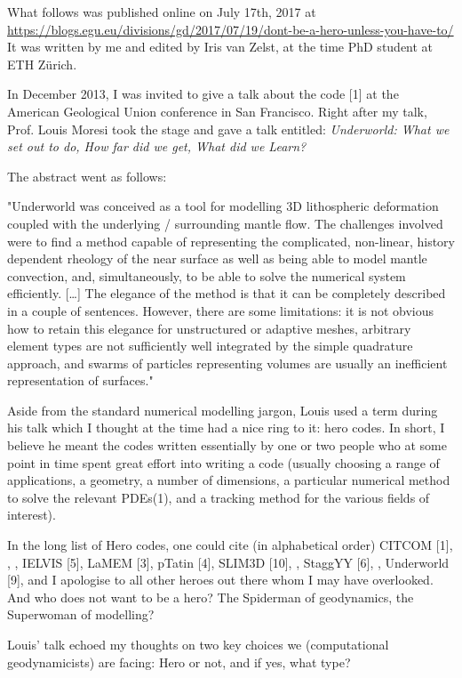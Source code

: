 What follows was published online on July 17th, 2017 at 
\url{https://blogs.egu.eu/divisions/gd/2017/07/19/dont-be-a-hero-unless-you-have-to/}
It was written by me and edited by Iris van Zelst, at the time PhD student at ETH Z\"urich.

\vspace{3mm}

In December 2013, I was invited to give a talk about the \aspect{} code [1] 
at the American Geological Union conference in San Francisco. Right 
after my talk, Prof. Louis Moresi took the stage and gave a talk entitled: 
{\it Underworld: What we set out to do, How far did we get, What did we Learn?}

The abstract went as follows:

"Underworld was conceived as a tool for modelling 3D lithospheric deformation coupled with the underlying / surrounding mantle flow. The challenges involved were to find a method capable of representing the complicated, non-linear, history dependent rheology of the near surface as well as being able to model mantle convection, and, simultaneously, to be able to solve the numerical system efficiently. […] The elegance of the method is that it can be completely described in a couple of sentences. However, there are some limitations: it is not obvious how to retain this elegance for unstructured or adaptive meshes, arbitrary element types are not sufficiently well integrated by the simple quadrature approach, and swarms of particles representing volumes are usually an inefficient representation of surfaces."

Aside from the standard numerical modelling jargon, Louis used a term during his talk which I thought at the time had a nice ring to it: hero codes. In short, I believe he meant the codes written essentially by one or two people who at some point in time spent great effort into writing a code (usually choosing a range of applications, a geometry, a number of dimensions, a particular numerical method to solve the relevant PDEs(1), and a tracking method for the various fields of interest).

In the long list of Hero codes, one could cite (in alphabetical order) CITCOM [1], \douar [8], \fantom [2], IELVIS [5], LaMEM [3], pTatin [4], SLIM3D [10], \sopale [7], StaggYY [6], \sulec [11], Underworld [9], and I apologise to all other heroes out there whom I may have overlooked. And who does not want to be a hero? The Spiderman of geodynamics, the Superwoman of modelling?

Louis' talk echoed my thoughts on two key choices we (computational geodynamicists) are facing: Hero or not, and if yes, what type?

